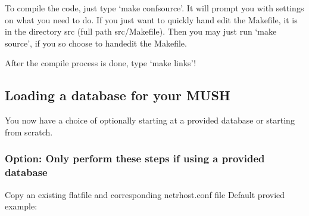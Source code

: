 \documentclass[letterpaper,10pt,english]{sphinxmanual}
\begin{document}
\sphinxAtStartPar
To compile the code, just type ‘make confsource’.  It will prompt you with settings on what you need to do.  If you just want to quickly hand edit the Makefile, it is in the directory src (full path src/Makefile).  Then you may just run ‘make source’, if you so choose to hand\sphinxhyphen{}edit the Makefile.

\sphinxAtStartPar
After the compile process is done, type ‘make links’!


\subsection{Loading a database for your MUSH}
\label{\detokenize{install:loading-a-database-for-your-mush}}
\sphinxAtStartPar
You now have a choice of optionally starting at a provided database or starting from scratch.


\subsubsection{Option: Only perform these steps if using a provided database}
\label{\detokenize{install:option-only-perform-these-steps-if-using-a-provided-database}}
\sphinxAtStartPar
Copy an existing flatfile and corresponding netrhost.conf file Default provied example:

\begin{sphinxVerbatim}[commandchars=\\\{\}]
  
   
 
   
\end{sphinxVerbatim}
\end{document}
